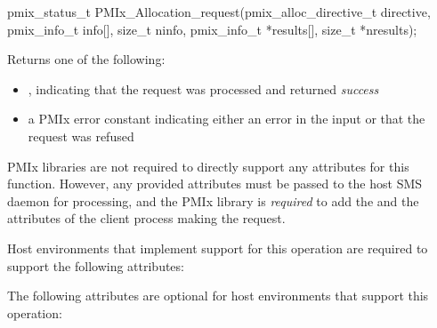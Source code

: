 \format

\cspecificstart
\begin{codepar}
pmix_status_t
PMIx_Allocation_request(pmix_alloc_directive_t directive,
                        pmix_info_t info[], size_t ninfo,
                        pmix_info_t *results[], size_t *nresults);
\end{codepar}
\cspecificend

\begin{arglist}
\end{arglist}

Returns one of the following:

\begin{itemize}
    \item {}, indicating that the request was processed and returned \textit{success}
    \item a PMIx error constant indicating either an error in the input or that the request was refused
\end{itemize}

\reqattrstart
\ac{PMIx} libraries are not required to directly support any attributes for this function. However, any provided attributes must be passed to the host \ac{SMS} daemon for processing, and the \ac{PMIx} library is \textit{required} to add the  and the  attributes of the client process making the request.

\divider

Host environments that implement support for this operation are required to support the following attributes:


\reqattrend

\optattrstart
The following attributes are optional for host environments that support this operation:


